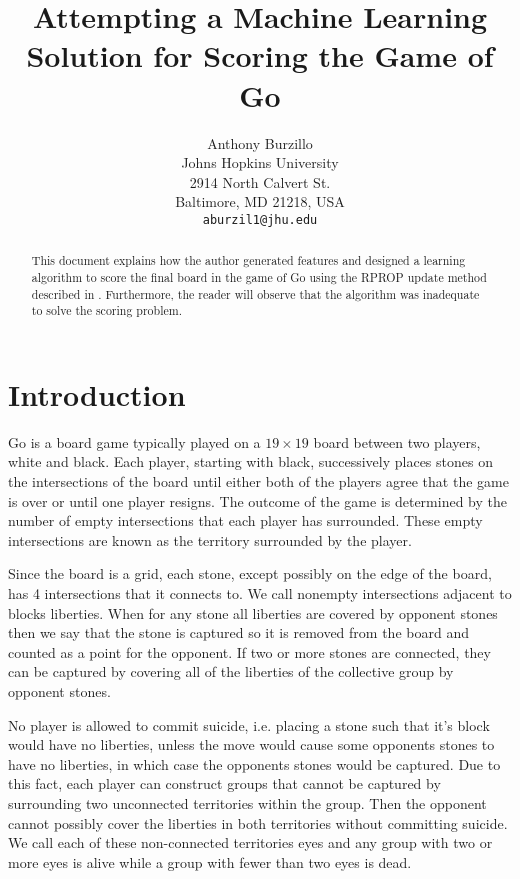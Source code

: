 \documentclass[11pt,letterpaper]{article}
\title{Attempting a Machine Learning Solution for Scoring the Game of Go}
\author{Anthony Burzillo\\
  Johns Hopkins University\\
  2914 North Calvert St.\\
  Baltimore, MD 21218, USA\\
  {\tt aburzil1@jhu.edu}}
\date{}
\begin{document}
\maketitle

\begin{abstract}
  This document explains how the author generated features and designed a learning algorithm to score the final
  board in the game of Go using the RPROP update method described in \cite{RB:93}. Furthermore, the reader
  will observe that the algorithm was inadequate to solve the scoring problem.
\end{abstract}

\section{Introduction}

Go is a board game typically played on a $19 \times 19$ board between two players, white and black. Each player,
starting with black, successively places stones on the intersections of the board until either both of the players
agree that the game is over or until one player resigns. The outcome of the game is determined by the number of
empty intersections that each player has surrounded. These empty intersections are known as the territory
surrounded by the player.

Since the board is a grid, each stone, except possibly on the edge of the board, has 4 intersections that it connects
to. We call nonempty intersections adjacent to blocks liberties. When for any stone all liberties are covered by
opponent stones then we say that the stone is captured so it is removed from the board and counted as a point for
the opponent. If two or more stones are connected, they can be captured by covering all of the liberties of the
collective group by opponent stones.

No player is allowed to commit suicide, i.e. placing a stone such that it's block would have no liberties, unless the
move would cause some opponents stones to have no liberties, in which case the opponents stones would be
captured. Due to this fact, each player can construct groups that cannot be captured by surrounding two
unconnected territories within the group. Then the opponent cannot possibly cover the liberties in both territories
without committing suicide. We call each of these non-connected territories eyes and any group with two or more
eyes is alive while a group with fewer than two eyes is dead.
\end{document}
